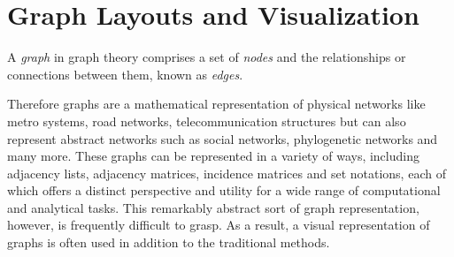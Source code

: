 \documentclass[bachelor, english]{algothesis}
\begin{document}
\section{Graph Layouts and Visualization}
\begin{definition}
    A \emph{graph} in graph theory comprises a set of \emph{nodes} and the relationships or connections between them, known as \emph{edges}.
\end{definition}
\noindent
Therefore graphs are a mathematical representation of physical networks like metro systems, road networks, telecommunication structures but can also represent abstract networks such as social networks, phylogenetic networks and many more. These graphs can be represented in a variety of ways, including adjacency lists, adjacency matrices, incidence matrices and set notations, each of which offers a distinct perspective and utility for a wide range of computational and analytical tasks. This remarkably  abstract sort of graph representation, however, is frequently difficult to grasp. As a result, a visual representation of graphs is often used in addition to the traditional methods.
\end{document}
